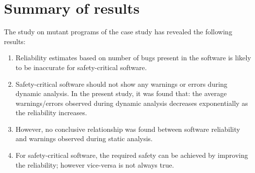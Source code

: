 \section{Summary of results}
The study on mutant programs of the case study has revealed the following results:
\begin{enumerate}
\item Reliability estimates based on number of bugs present in the software is likely to be inaccurate for safety-critical software.
\item Safety-critical software should not show any warnings or errors during dynamic analysis. In the present study, it was found that: the average warnings/errors observed during dynamic analysis decreases exponentially as the reliability increases.
\item However, no conclusive relationship was found between software reliability and warnings observed during static analysis.
\item For safety-critical software, the required safety can be achieved by improving the reliability; however vice-versa is not always true.

\end{enumerate}